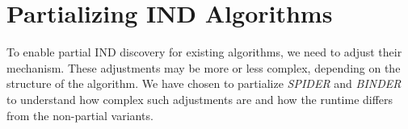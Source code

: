 \chapter{Partializing IND Algorithms}\label{sec:algo_partial}
To enable partial IND discovery for existing algorithms, we need to adjust their mechanism. These adjustments may be more or less complex, depending on the structure of the algorithm. We have chosen to partialize \textit{SPIDER} \cite{bauckmann2006efficiently} and \textit{BINDER} \cite{papenbrock2015divide} to understand how complex such adjustments are and how the runtime differs from the non-partial variants.

